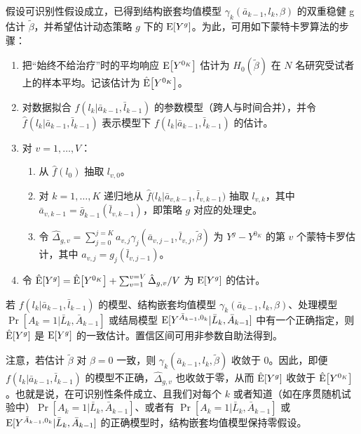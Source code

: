\begin{techpoint}
假设可识别性假设成立，已得到结构嵌套均值模型 $\gamma_k(\bar a_{k-1},l_k,\beta)$ 的双重稳健 g 估计 $\tilde\beta$，并希望估计动态策略 $g$ 下的 $\mathrm{E}[Y^g]$。为此，可用如下蒙特卡罗算法的步骤：

\begin{enumerate}[label=\arabic*.,leftmargin=1.9em]
\item 把“始终不给治疗”时的平均响应 $\mathrm{E}\big[Y^{0_K}\big]$ 估计为 $H_0(\tilde\beta)$ 在 $N$ 名研究受试者上的样本平均。记该估计为 $\hat{\mathrm{E}}\big[Y^{0_K}\big]$。
\item 对数据拟合 $f(l_k|\bar a_{k-1},\bar l_{k-1})$ 的参数模型（跨人与时间合并），并令 $\hat f(l_k|\bar a_{k-1},\bar l_{k-1})$ 表示模型下 $f(l_k|\bar a_{k-1},\bar l_{k-1})$ 的估计。
\item 对 $v=1,\dots,V$：
\begin{enumerate}[label=(\alph*),leftmargin=1.7em]
\item 从 $\hat f(l_0)$ 抽取 $l_{v,0}$。
\item 对 $k=1,\dots,K$ 递归地从 $\hat f\big(l_k|\bar a_{v,k-1},\bar l_{v,k-1}\big)$ 抽取 $l_{v,k}$，其中 $\bar a_{v,k-1}=\bar g_{k-1}(\bar l_{v,k-1})$，即策略 $g$ 对应的处理史。
\item 令 $\hat\Delta_{g,v}=\sum_{j=0}^{j=K}a_{v,j}\gamma_j(\bar a_{v,j-1},\bar l_{v,j},\tilde\beta)$ 为 $Y^g-Y^{0_K}$ 的第 $v$ 个蒙特卡罗估计，其中 $a_{v,j}=g_j(\bar l_{v,j-1})$。
\end{enumerate}
\item 令 $\hat{\mathrm{E}}[Y^g]=\hat{\mathrm{E}}\big[Y^{0_K}\big]+\sum_{v=1}^{v=V}\hat\Delta_{g,v}/V$ 为 $\mathrm{E}[Y^g]$ 的估计。
\end{enumerate}

若 $f(l_k|\bar a_{k-1},\bar l_{k-1})$ 的模型、结构嵌套均值模型 $\gamma_k(\bar a_{k-1},l_k,\beta)$、处理模型 $\Pr[A_k=1|\bar L_k,\bar A_{k-1}]$ 或结局模型 $\mathrm{E}[Y^{\bar A_{k-1},0_k}|\bar L_k,\bar A_{k-1}]$ 中有一个正确指定，则 $\hat{\mathrm{E}}[Y^g]$ 是 $\mathrm{E}[Y^g]$ 的一致估计。置信区间可用非参数自助法得到。

注意，若估计 $\tilde\beta$ 对 $\beta=0$ 一致，则 $\gamma_k(\bar a_{k-1},l_k,\tilde\beta)$ 收敛于 0。因此，即便 $f(l_k|\bar a_{k-1},\bar l_{k-1})$ 的模型不正确，$\hat\Delta_{g,v}$ 也收敛于零，从而 $\hat{\mathrm{E}}[Y^g]$ 收敛于 $\hat{\mathrm{E}}\big[Y^{0_K}\big]$。也就是说，在可识别性条件成立、且我们对每个 $k$ 或者知道（如在序贯随机试验中）$\Pr[A_k=1|\bar L_k,\bar A_{k-1}]$、或者有 $\Pr[A_k=1|\bar L_k,\bar A_{k-1}]$ 或 $\mathrm{E}[Y^{\bar A_{k-1},0_k}|\bar L_k,\bar A_{k-1}]$ 的正确模型时，结构嵌套均值模型保持零假设。
\end{techpoint}

